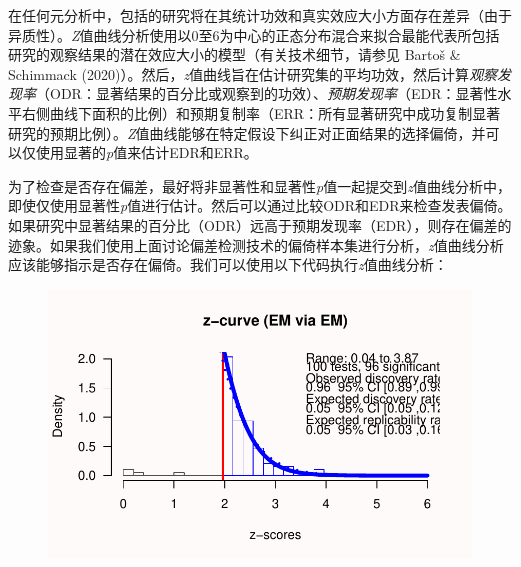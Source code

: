 \documentclass[
  letterpaper,
  DIV=11,
  numbers=noendperiod]{scrreprt}
\newenvironment{Shaded}{\begin{snugshade}}{\end{snugshade}}
\newcommand{\AttributeTok}[1]{\textcolor[rgb]{0.40,0.45,0.13}{#1}}
\newcommand{\ConstantTok}[1]{\textcolor[rgb]{0.56,0.35,0.01}{#1}}
\newcommand{\DecValTok}[1]{\textcolor[rgb]{0.68,0.00,0.00}{#1}}
\newcommand{\FunctionTok}[1]{\textcolor[rgb]{0.28,0.35,0.67}{#1}}
\newcommand{\NormalTok}[1]{\textcolor[rgb]{0.00,0.23,0.31}{#1}}
\newcommand{\OtherTok}[1]{\textcolor[rgb]{0.00,0.23,0.31}{#1}}
\newcommand{\SpecialCharTok}[1]{\textcolor[rgb]{0.37,0.37,0.37}{#1}}
\newcommand{\StringTok}[1]{\textcolor[rgb]{0.13,0.47,0.30}{#1}}
\begin{document}
在任何元分析中，包括的研究将在其统计功效和真实效应大小方面存在差异（由于异质性）。\emph{Z}值曲线分析使用以0至6为中心的正态分布混合来拟合最能代表所包括研究的观察结果的潜在效应大小的模型（有关技术细节，请参见
Bartoš \& Schimmack
(2020)）。然后，\emph{z}值曲线旨在估计研究集的平均功效，然后计算\emph{观察发现率}（ODR：显著结果的百分比或观察到的功效）、\emph{预期发现率}（EDR：显著性水平右侧曲线下面积的比例）和预期复制率（ERR：所有显著研究中成功复制显著研究的预期比例）。\emph{Z}值曲线能够在特定假设下纠正对正面结果的选择偏倚，并可以仅使用显著的\emph{p}值来估计EDR和ERR。

为了检查是否存在偏差，最好将非显著性和显著性\emph{p}值一起提交到\emph{z}值曲线分析中，即使仅使用显著性\emph{p}值进行估计。然后可以通过比较ODR和EDR来检查发表偏倚。如果研究中显著结果的百分比（ODR）远高于预期发现率（EDR），则存在偏差的迹象。如果我们使用上面讨论偏差检测技术的偏倚样本集进行分析，\emph{z}值曲线分析应该能够指示是否存在偏倚。我们可以使用以下代码执行\emph{z}值曲线分析：

\begin{Shaded}
\end{Shaded}

\begin{figure}

{\centering \includegraphics[width=1\textwidth,height=\textheight]{12-bias_files/figure-pdf/unnamed-chunk-4-1.pdf}

}

\end{figure}
\end{document}

